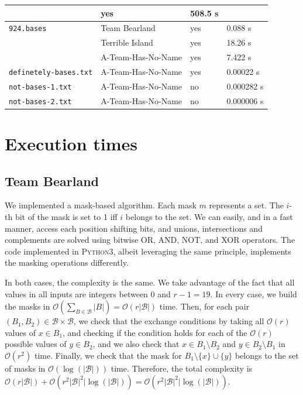 \documentclass[11pt]{amsart}
\begin{document}
\begin{center}
\begin{tabular}[c]{llll}
    & yes
    & 508.5 s
    \\\hline
    \texttt{924.bases}
    & Team Bearland
    & yes
    & 0.088 s
    \\
    & Terrible Island
    & yes
    & 18.26 s
    \\
    & A-Team-Has-No-Name
    & yes
    & 7.422 s
    \\\hline
    \texttt{definetely-bases.txt}
    & A-Team-Has-No-Name
    & yes
    & 0.00022 s
    \\\hline
    \texttt{not-bases-1.txt}
    & A-Team-Has-No-Name
    & no
    & 0.000282 s
    \\\hline
    \texttt{not-bases-2.txt}
    & A-Team-Has-No-Name
    & no
    & 0.000006 s
    \\\hline    
  \end{tabular}
\end{center}

\section{Execution times}

\subsection{Team Bearland}

We implemented a mask-based algorithm.
Each mask $m$ represents a set.
The $i$-th bit of the mask is set to 1 iff $i$ belongs to the set.
We can easily, and in a fast manner, access each position shifting bits, and unions, intersections and complements are solved using bitwise OR, AND, NOT, and XOR operators.
The code implemented in \textsc{Python3}, albeit leveraging the same principle, implements the masking operations differently.
 
In both cases, the complexity is the same. We take advantage of the fact that all values in all inputs are integers between $0$ and $r - 1 = 19$. In every case, we build the masks in $\mathcal{O}(\sum_{B \in \mathcal{B}} |B|) = \mathcal{O}(r|\mathcal{B}|)$ time. Then, for each pair $(B_1, B_2) \in \mathcal{B} \times \mathcal{B}$, we check that the exchange conditions by taking all $\mathcal{O}(r)$ values of $x \in B_1$, and checking if the condition holds for each of the $\mathcal{O}(r)$ possible values of $y \in B_2$, and we also check that $x \in B_1 \setminus B_2$ and $y \in B_2 \setminus B_1$ in $\mathcal{O}(r^2)$ time. Finally, we check that the mask for $B_1 \setminus \{x\} \cup \{y\}$ belongs to the set of masks in $\mathcal{O}(\log(|\mathcal{B}|))$ time. Therefore, the total complexity is $\mathcal{O}(r |\mathcal{B}|) + \mathcal{O}(r^2 |\mathcal{B}|^2| \log(|\mathcal{B}|)) =  \mathcal{O}(r^2 |\mathcal{B}|^2| \log(|\mathcal{B}|))$.
\end{document}
